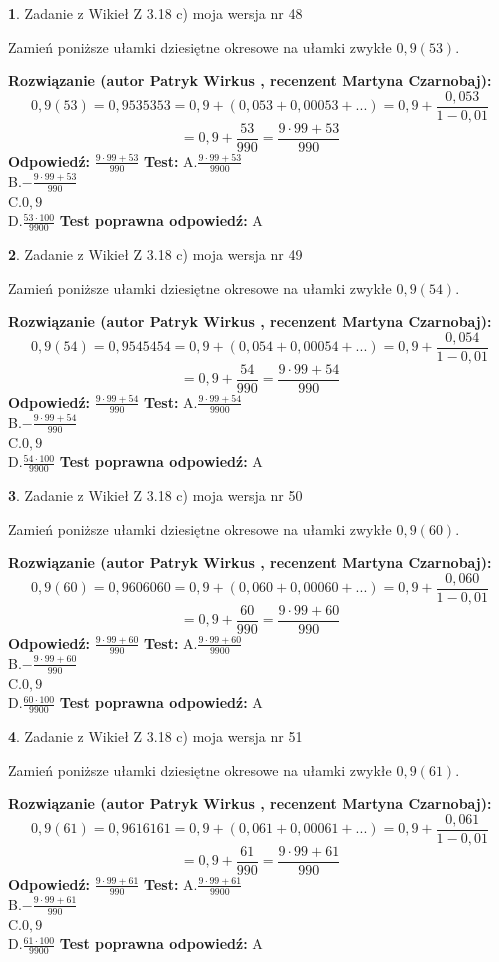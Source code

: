 \documentclass[12pt, a4paper]{article}
\theoremstyle{definition} %
\newtheorem{zad}{}
\newcommand{\zadStart}[1]{\begin{zad}#1\newline}
\newcommand{\zadStop}{\end{zad}}
\newcommand{\rozwStart}[2]{\noindent \textbf{Rozwiązanie (autor #1 , recenzent #2): }\newline}
\newcommand{\rozwStop}{\newline}
\newcommand{\odpStart}{\noindent \textbf{Odpowiedź:}\newline}
\newcommand{\odpStop}{\newline}
\newcommand{\testStart}{\noindent \textbf{Test:}\newline}
\newcommand{\testStop}{\newline}
\newcommand{\kluczStart}{\noindent \textbf{Test poprawna odpowiedź:}\newline}
\newcommand{\kluczStop}{\newline}
\begin{document}
\zadStart{Zadanie z Wikieł Z 3.18 c) moja wersja nr 48}

Zamień poniższe ułamki dziesiętne okresowe na ułamki zwykłe $0,9(53)$.
\zadStop
\rozwStart{Patryk Wirkus}{Martyna Czarnobaj}
$$0,9(53)=0,9535353=0,9+(0,053+0,00053+...)=0,9+\frac{0,053}{1-0,01}$$
$$=0,9+\frac{53}{990}=\frac{9\cdot99+53}{990}$$
\rozwStop
\odpStart
$\frac{9\cdot99+53}{990}$
\odpStop
\testStart
A.$\frac{9\cdot99+53}{9900}$\\ B.$-\frac{9\cdot99+53}{990}$\\ C.$0,9$\\ D.$\frac{53\cdot100}{9900}$
\testStop
\kluczStart
A
\kluczStop



\zadStart{Zadanie z Wikieł Z 3.18 c) moja wersja nr 49}

Zamień poniższe ułamki dziesiętne okresowe na ułamki zwykłe $0,9(54)$.
\zadStop
\rozwStart{Patryk Wirkus}{Martyna Czarnobaj}
$$0,9(54)=0,9545454=0,9+(0,054+0,00054+...)=0,9+\frac{0,054}{1-0,01}$$
$$=0,9+\frac{54}{990}=\frac{9\cdot99+54}{990}$$
\rozwStop
\odpStart
$\frac{9\cdot99+54}{990}$
\odpStop
\testStart
A.$\frac{9\cdot99+54}{9900}$\\ B.$-\frac{9\cdot99+54}{990}$\\ C.$0,9$\\ D.$\frac{54\cdot100}{9900}$
\testStop
\kluczStart
A
\kluczStop



\zadStart{Zadanie z Wikieł Z 3.18 c) moja wersja nr 50}

Zamień poniższe ułamki dziesiętne okresowe na ułamki zwykłe $0,9(60)$.
\zadStop
\rozwStart{Patryk Wirkus}{Martyna Czarnobaj}
$$0,9(60)=0,9606060=0,9+(0,060+0,00060+...)=0,9+\frac{0,060}{1-0,01}$$
$$=0,9+\frac{60}{990}=\frac{9\cdot99+60}{990}$$
\rozwStop
\odpStart
$\frac{9\cdot99+60}{990}$
\odpStop
\testStart
A.$\frac{9\cdot99+60}{9900}$\\ B.$-\frac{9\cdot99+60}{990}$\\ C.$0,9$\\ D.$\frac{60\cdot100}{9900}$
\testStop
\kluczStart
A
\kluczStop



\zadStart{Zadanie z Wikieł Z 3.18 c) moja wersja nr 51}

Zamień poniższe ułamki dziesiętne okresowe na ułamki zwykłe $0,9(61)$.
\zadStop
\rozwStart{Patryk Wirkus}{Martyna Czarnobaj}
$$0,9(61)=0,9616161=0,9+(0,061+0,00061+...)=0,9+\frac{0,061}{1-0,01}$$
$$=0,9+\frac{61}{990}=\frac{9\cdot99+61}{990}$$
\rozwStop
\odpStart
$\frac{9\cdot99+61}{990}$
\odpStop
\testStart
A.$\frac{9\cdot99+61}{9900}$\\ B.$-\frac{9\cdot99+61}{990}$\\ C.$0,9$\\ D.$\frac{61\cdot100}{9900}$
\testStop
\kluczStart
A
\kluczStop
\end{document}
